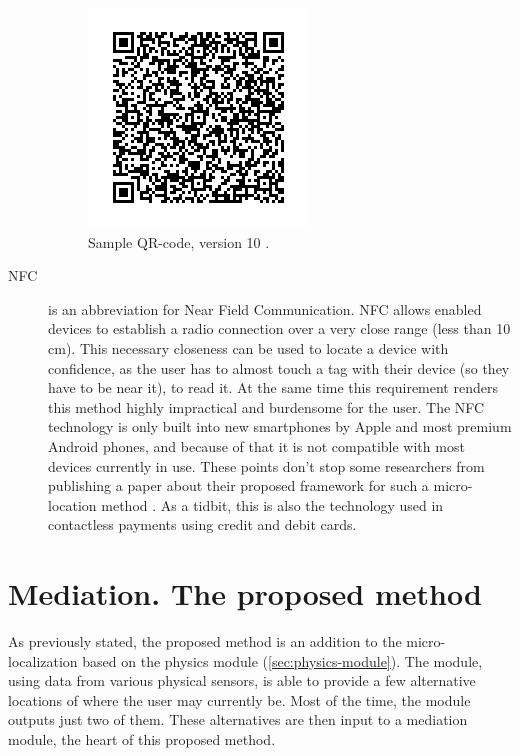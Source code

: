 \begin{description}
	\begin{figure}
		\centering
		\includegraphics{qr-code}
		\caption{Sample QR-code, version 10 \cite{wiki:qr-code}.}
		\label{fig:qr-code}
	\end{figure}
	
	\item[NFC] is an abbreviation for Near Field Communication. NFC allows enabled devices to establish a radio connection over a very close range (less than 10 cm). This necessary closeness can be used to locate a device with confidence, as the user has to almost touch a tag with their device (so they have to be near it), to read it. At the same time this requirement renders this method highly impractical and burdensome for the user. The NFC technology is only built into new smartphones by Apple and most premium Android phones, and because of that it is not compatible with most devices currently in use. These points don't stop some researchers from publishing a paper about their proposed framework for such a micro-location method \cite{nfc-ulocation}. As a tidbit, this is also the technology used in contactless payments using credit and debit cards.
	
\end{description}

\section{Mediation. The proposed method}
\label{sec:mediation}

As previously stated, the proposed method is an addition to the micro-localization based on the physics module (\cref{sec:physics-module}). The module, using data from various physical sensors, is able to provide a few alternative locations of where the user may currently be. Most of the time, the module outputs just two of them. These alternatives are then input to a mediation module, the heart of this proposed method.

